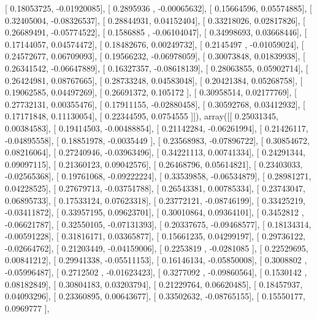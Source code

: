 \documentclass{article}
\begin{document}
       [ 0.18053725, -0.01920085],
       [ 0.2895936 , -0.00065632],
       [ 0.15664596,  0.05574885],
       [ 0.32405004, -0.08326537],
       [ 0.28844931,  0.04152404],
       [ 0.33218026,  0.02817826],
       [ 0.26689491, -0.05774522],
       [ 0.1586885 , -0.06104047],
       [ 0.34998693,  0.03668446],
       [ 0.17144057,  0.04574472],
       [ 0.18482676,  0.00249732],
       [ 0.2145497 , -0.01059024],
       [ 0.24572677,  0.06709093],
       [ 0.19566232, -0.06978059],
       [ 0.30073848,  0.01839938],
       [ 0.26341542, -0.06647889],
       [ 0.16327357, -0.08618139],
       [ 0.28063855,  0.05902714],
       [ 0.26424981,  0.08767665],
       [ 0.28733248,  0.04583048],
       [ 0.20421384,  0.05268758],
       [ 0.19062585,  0.04497269],
       [ 0.26691372,  0.105172  ],
       [ 0.30958514,  0.02177769],
       [ 0.27732131,  0.00355476],
       [ 0.17911155, -0.02880458],
       [ 0.30592768,  0.03412932],
       [ 0.17171848,  0.11130054],
       [ 0.22344595,  0.0754555 ]]), array([[ 0.25031345,  0.00384583],
       [ 0.19414503, -0.00488854],
       [ 0.21142284, -0.06261994],
       [ 0.21426117, -0.04895558],
       [ 0.18851978, -0.0035449 ],
       [ 0.23568983, -0.07896722],
       [ 0.30854672,  0.08216064],
       [ 0.27240946, -0.03963496],
       [ 0.34221113,  0.00741334],
       [ 0.24291344,  0.09097115],
       [ 0.21360123,  0.09042576],
       [ 0.26468796,  0.05614821],
       [ 0.23403033, -0.02565368],
       [ 0.19761068, -0.09222224],
       [ 0.33539858, -0.06534879],
       [ 0.28981271,  0.04228525],
       [ 0.27679713, -0.03751788],
       [ 0.26543381,  0.00785334],
       [ 0.23743047,  0.06895733],
       [ 0.17533124,  0.07623318],
       [ 0.23772121, -0.08746199],
       [ 0.33425219, -0.03411872],
       [ 0.33957195,  0.09623701],
       [ 0.30010864,  0.09364101],
       [ 0.3452812 , -0.06621787],
       [ 0.32550105, -0.07131393],
       [ 0.20337675, -0.09468577],
       [ 0.18134314, -0.00591228],
       [ 0.31816171,  0.03365877],
       [ 0.15661235,  0.04299197],
       [ 0.29736122, -0.02664762],
       [ 0.21203449, -0.04159006],
       [ 0.2253819 , -0.0281085 ],
       [ 0.22529695,  0.00841212],
       [ 0.29941338, -0.05511153],
       [ 0.16146134, -0.05850008],
       [ 0.3008802 , -0.05996487],
       [ 0.2712502 , -0.01623423],
       [ 0.3277092 , -0.09860564],
       [ 0.1530142 ,  0.08182849],
       [ 0.30804183,  0.03203794],
       [ 0.21229764,  0.06620485],
       [ 0.18457937,  0.04093296],
       [ 0.23360895,  0.00643677],
       [ 0.33502632, -0.08765155],
       [ 0.15550177,  0.0969777 ],
\end{document}
